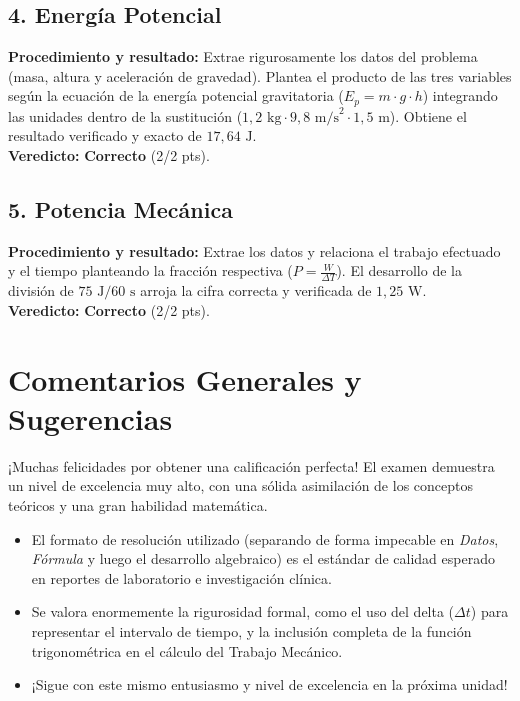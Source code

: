 \documentclass[12pt,letterpaper]{article}
\begin{document}
\subsection*{4. Energía Potencial}
\textbf{Procedimiento y resultado:} Extrae rigurosamente los datos del problema (masa, altura y aceleración de gravedad). Plantea el producto de las tres variables según la ecuación de la energía potencial gravitatoria ($E_p = m \cdot g \cdot h$) integrando las unidades dentro de la sustitución ($1,2 \text{ kg} \cdot 9,8 \text{ m/s}^2 \cdot 1,5 \text{ m}$). Obtiene el resultado verificado y exacto de $17,64 \text{ J}$. \\
\textbf{Veredicto:} \textbf{Correcto} (2/2 pts).

\subsection*{5. Potencia Mecánica}
\textbf{Procedimiento y resultado:} Extrae los datos y relaciona el trabajo efectuado y el tiempo planteando la fracción respectiva ($P = \frac{W}{\Delta T}$). El desarrollo de la división de $75 \text{ J} / 60 \text{ s}$ arroja la cifra correcta y verificada de $1,25 \text{ W}$. \\
\textbf{Veredicto:} \textbf{Correcto} (2/2 pts).

\vspace{0.5cm}
\section*{Comentarios Generales y Sugerencias}
¡Muchas felicidades por obtener una calificación perfecta! El examen demuestra un nivel de excelencia muy alto, con una sólida asimilación de los conceptos teóricos y una gran habilidad matemática.
\begin{itemize}
    \item El formato de resolución utilizado (separando de forma impecable en \textit{Datos}, \textit{Fórmula} y luego el desarrollo algebraico) es el estándar de calidad esperado en reportes de laboratorio e investigación clínica.
    \item Se valora enormemente la rigurosidad formal, como el uso del delta ($\Delta t$) para representar el intervalo de tiempo, y la inclusión completa de la función trigonométrica en el cálculo del Trabajo Mecánico.
    \item ¡Sigue con este mismo entusiasmo y nivel de excelencia en la próxima unidad!
\end{itemize}
\end{document}
